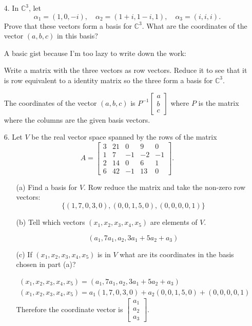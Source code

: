 \documentclass{article}
\begin{document}
\begin{enumerate}[listparindent=\parindent]
\item[4.] In \(\mathbb{C}^3\), let
    \[
        \alpha_1 = (1, 0, -i),\quad \alpha_2 = (1 + i, 1 - i, 1),\quad \alpha_3 = (i, i, i).
    \]
    Prove that these vectors form a basis for \(\mathbb{C}^3\).
    What are the coordinates of the vector \((a, b, c)\) in this basis?

    A basic gist because I'm too lazy to write down the work: 

    Write a matrix with the three vectors as row vectors. Reduce it to see that it is row equivalent to a identity matrix
    so the three form a basis for \(\mathbb{C}^3\).

    The coordinates of the vector \((a, b, c)\) is \(P^{-1}\begin{bmatrix}a \\ b \\ c\end{bmatrix}\)
    where \(P\) is the matrix where the columns are the given basis vectors.

\item[6.] Let \(V\) be the real vector space spanned by the rows of the matrix
    \[
        A = \begin{bmatrix}
            3 & 21 & 0 & 9 & 0 \\
            1 & 7 & -1 & -2 & -1 \\
            2 & 14 & 0 & 6 & 1 \\
            6 & 42 & -1 & 13 & 0
        \end{bmatrix}.
    \]
    \begin{enumerate}[listparindent=\parindent]
        \item[(a)] Find a basis for \(V\).
            Row reduce the matrix and take the non-zero row vectors:
            \[
                \{ (1, 7, 0, 3, 0), (0, 0, 1, 5, 0), (0, 0, 0, 0, 1) \}
            \]
        \item[(b)] Tell which vectors \((x_1, x_2, x_3, x_4, x_5)\) are elements of \(V\).

            \[ (a_1, 7a_1, a_2, 3a_1 + 5a_2 + a_3) \]

        \item[(c)] If \((x_1, x_2, x_3, x_4, x_5)\) is in \(V\) what are its coordinates in the basis chosen in part (a)?

            \begin{gather*}
                (x_1, x_2 , x_3, x_4, x_5) = (a_1, 7a_1, a_2, 3a_1 + 5a_2 + a_3) \\
                (x_1, x_2 , x_3, x_4, x_5) = a_1(1, 7, 0, 3, 0) + a_2(0, 0, 1, 5, 0) + (0, 0, 0, 0, 1)
            \end{gather*}
            Therefore the coordinate vector is \(\begin{bmatrix}a_1 \\ a_2 \\ a_3\end{bmatrix}\).
    \end{enumerate}


\end{enumerate}
\end{document}
